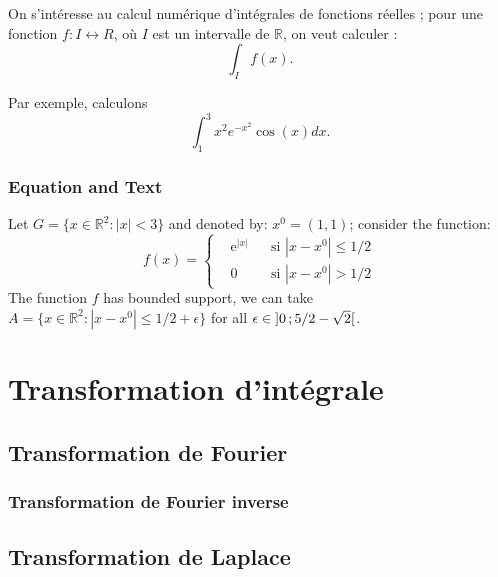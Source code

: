 On s’intéresse au calcul numérique d’intégrales de fonctions réelles ; pour une
fonction $f : I \longleftrightarrow R$, où $I$ est un intervalle de $\mathbb{R}$, on veut calculer :
\[
\int_{I} f\left(x\right).
\]

Par exemple, calculons
\[
 \int_{1}^{3} x^{2}e^{-x^{2}}\cos\left(x\right) dx.
\] 

\subsection{Equation and Text}

\begin{example}
Let $G=\{x\in\mathbb{R}^2:|x|<3\}$ and denoted by: $x^0=(1,1)$; consider the function:
\begin{equation}
f(x)=\left\{\begin{aligned} & \mathrm{e}^{|x|} & & \text{si $|x-x^0|\leq 1/2$}\\
& 0 & & \text{si $|x-x^0|> 1/2$}\end{aligned}\right.
\end{equation}
The function $f$ has bounded support, we can take $A=\{x\in\mathbb{R}^2:|x-x^0|\leq 1/2+\epsilon\}$ for all $\epsilon\in\mathopen{]}0\,;5/2-\sqrt{2}\mathclose{[}$.
\end{example}

\chapter{Transformation d'intégrale}
 \section{Transformation de Fourier}
 \begin{exercise}
 \end{exercise}
 \begin{exercise}
 \end{exercise}
 \begin{exercise}
 \end{exercise}
  \subsection{Transformation de Fourier inverse}
  \begin{exercise}
 \end{exercise}
 \begin{exercise}
 \end{exercise}
 \section{Transformation de Laplace}
 \begin{python}
 \end{python}
 \begin{exercise}
 \end{exercise}
